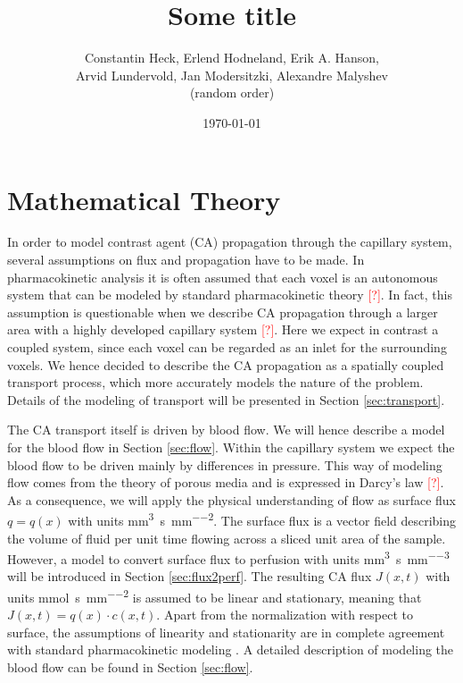 \documentclass[paper=a4, fontsize=12pt,parskip=half,headings=small]{scrartcl}
\title{Some title}
\author{Constantin Heck, Erlend Hodneland, Erik A. Hanson, \\ Arvid Lundervold, Jan Modersitzki, Alexandre Malyshev \\ (random order)}
\date{\today}
\newcommand{\siq}{\cubic\milli\meter\per\second\per\square\milli\meter}
\newcommand{\siP}{\cubic\milli\meter\per\second\per\cubic\milli\meter}
\newcommand{\siJ}{\milli\mol\per\second\per\square\milli\meter}
\newcommand{\missingsource}{\textcolor{red}{[?]}}
\begin{document}


	\section{Mathematical Theory} \label{sec:maththeory}
		
	In order to model contrast agent (CA) propagation through the capillary system, several assumptions on flux and propagation have to be made.
	In pharmacokinetic analysis it is often assumed that each voxel is an autonomous system that can be modeled by standard pharmacokinetic theory \missingsource.
	In fact, this assumption is questionable when we describe CA propagation through a larger area with a highly developed capillary system \missingsource.
	Here we expect in contrast a coupled system, since each voxel can be regarded as an inlet for the surrounding voxels.
	We hence decided to describe the CA propagation as a spatially coupled transport process, which more accurately models the nature of the problem. 
	Details of the modeling of transport will be presented in Section \ref{sec:transport}.
	
	The CA transport itself is driven by blood flow. 
	We will hence describe a model for the blood flow in Section \ref{sec:flow}.
	Within the capillary system we expect the blood flow to be driven mainly by differences in pressure.
	This way of modeling flow comes from the theory of porous media and is expressed in Darcy's law \missingsource.
	As a consequence, we will apply the physical understanding of flow as surface flux $q = q(x)$ with units \si{\siq}.
	The surface flux is a vector field describing the volume of fluid per unit time flowing across a sliced unit area of the sample.	
	However, a model to convert surface flux to perfusion with units \si{\siP} will be introduced in Section \ref{sec:flux2perf}.
	The resulting CA flux $J(x,t)$ with units \si{\siJ} is assumed to be linear and stationary, meaning that $J(x,t) = q(x)\cdot c(x,t)$.
	Apart from the normalization with respect to surface, the assumptions of linearity and stationarity are in complete agreement with standard pharmacokinetic modeling \cite{sourbron13}.
	A detailed description of modeling the blood flow can be found in Section \ref{sec:flow}.
	
\end{document}
